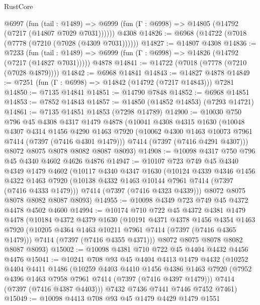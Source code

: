 \begin{lexlean}{RustCore}
\begin{coremodule}
    @6997
      (fun (tail : @1489) =>
      @6999 (fun (Γ : @6998) => @14805 (@14792 (@7217 (@14807 @7029 @7031))))))
    @4308
@14826 := @6968 (@14722 (@7018 (@7778 (@7210 (@7028 (@4309 @7031))))))
@14827 := @14807 @4308
@14836 := @7233
    (fun (tail : @1489) => @6999 (fun (Γ : @6998) => @14826 (@14792 (@7217 (@14827 @7031)))))
    @4878
@14841 := @14722 (@7018 (@7778 (@7210 (@7028 @4879))))
@14842 := @6968 @14841
@14843 := @14827 @4878
@14849 := @7251 (fun (Γ : @6998) => @14842 (@14792 (@7217 @14843))) @7281
@14850 := @7135 @14841
@14851 := @14790 @7848
@14852 := @6968 @14851
@14853 := @7852 @14843
@14857 := @14850 (@14852 @14853) (@7293 @14721)
@14861 := @7135 @14851 @14853 (@7298 @14789)
@14900 := @10030
    @750
    @796
    @45
    @4308
    @4317
    @1479
    @4878
    (@10041
      @4308
      @4315
      @1630
      (@10048
        @4307
        @4314
        @1456
        @4290
        @1463
        @7920
        (@10062 @4300 @1463 @10073 @7961 @7414 (@7397 (@7416 @4301 @1479)))
        @7414
        (@7397 (@7416 @4291 @4307)))
      @8072
      @8075
      @8078
      @8082
      @8087
      @8093)
@14908 := @10098 @4317 @750 @796 @45 @4340 @4602 @4626 @4876
@14947 := @10107
    @723
    @749
    @45
    @4340
    @4349
    @1479
    @4602
    (@10117
      @4340
      @4347
      @1630
      (@10124
        @4339
        @4346
        @1456
        @4322
        @1463
        @7920
        (@10138 @4332 @1463 @10144 @7961 @7414 (@7397 (@7416 @4333 @1479)))
        @7414
        (@7397 (@7416 @4323 @4339)))
      @8072
      @8075
      @8078
      @8082
      @8087
      @8093)
@14955 := @10098 @4349 @723 @749 @45 @4372 @4478 @4502 @4600
@14994 := @10174
    @710
    @722
    @45
    @4372
    @4381
    @1479
    @4478
    (@10184
      @4372
      @4379
      @1630
      (@10191
        @4371
        @4378
        @1456
        @4354
        @1463
        @7920
        (@10205 @4364 @1463 @10211 @7961 @7414 (@7397 (@7416 @4365 @1479)))
        @7414
        (@7397 (@7416 @4355 @4371)))
      @8072
      @8075
      @8078
      @8082
      @8087
      @8093)
@15002 := @10098 @4381 @710 @722 @45 @4404 @4432 @4456 @4476
@15041 := @10241
    @708
    @93
    @45
    @4404
    @4413
    @1479
    @4432
    (@10252
      @4404
      @4411
      @1486
      (@10259
        @4403
        @4410
        @1456
        @4386
        @1463
        @7920
        (@7952 @4396 @1463 @7958 @7961 @7414 (@7397 (@7416 @4397 @1479)))
        @7414
        (@7397 (@7416 @4387 @4403)))
      @7432
      @7436
      @7441
      @7446
      @7452
      @7461)
@15049 := @10098 @4413 @708 @93 @45 @1479 @4429 @1479 @1551

\end{coremodule}
\end{lexlean}

